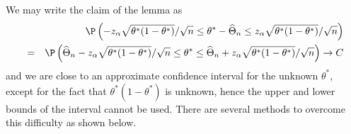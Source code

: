 We may write the claim of the lemma as 
\begin{eqnarray}
&&\P \left( -z_{\alpha}\sqrt{\theta^*(1-\theta^*)}/\sqrt{n}\leq \theta^*-\widehat{\Theta}%
_{n}\leq z_{\alpha}\sqrt{\theta^*(1-\theta^*)}/\sqrt{n}\right) \\
&=&\P \left( \widehat{\Theta}_{n}-z_{\alpha}\sqrt{\theta^*(1-\theta^*)}/\sqrt{n}\leq
\theta^* \leq \widehat{\Theta}_{n}+z_{\alpha}\sqrt{\theta^*(1-\theta^*)}/\sqrt{n}\right)
\rightarrow C  \label{asympt-coverage}
\end{eqnarray}%
and we are close to an approximate confidence interval for the unknown $\theta^*$,
except for the fact that $\theta^*(1-\theta^*)$ is unknown, hence the upper and lower
bounds of the interval cannot be used. There are several methods to overcome
this difficulty as shown below.


